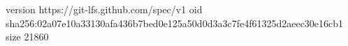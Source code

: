 version https://git-lfs.github.com/spec/v1
oid sha256:02a07e10a33130afa436b7bed0e125a50d0d3a3c7fe4f61325d2aeec30e16cb1
size 21860
